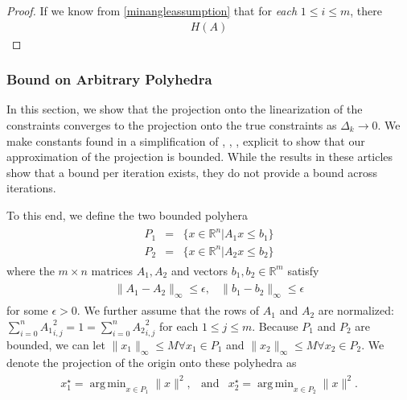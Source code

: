\documentclass{article}
\theoremstyle{case}
\numberwithin{theorem}{subsection}
\DeclareMathOperator*{\argmin}{arg\,min}
\newcommand{\dk}{\Delta_k}
\newcommand{\Rm}{\mathbb R^m}
\newcommand{\Rn}{\mathbb R^n}
\begin{document}
\begin{proof}
If we know from \cref{minangleassumption} that for \emph{each} $1 \le i \le m$, there 
\begin{align*}
H(A)
\end{align*}
\end{proof}

\subsubsection{Bound on Arbitrary Polyhedra}

In this section, we show that the projection onto the linearization of the constraints converges to the projection onto the true constraints as $\dk \to 0$.
We make constants found in a simplification of 
\cite{pena2020new},
\cite{hoffman_theorem},
\cite{continuity_of_metric_projections},
\cite{perturbations_of_linear_inequalities} 
explicit to show that our approximation of the projection is bounded.
While the results in these articles show that a bound per iteration exists, they do not provide a bound across iterations.

To this end, we define the two bounded polyhera
\begin{align*}
\begin{array}{ccc}
P_1 &=& \{ x \in \Rn | A_1x\le b_1 \} \\
P_2 &=& \{ x \in \Rn | A_2x\le b_2 \}
\end{array}
\end{align*}
where the $m\times n$ matrices $A_1, A_2$ and vectors $b_1, b_2 \in \Rm$ satisfy
\begin{align*}
\begin{array}{cc}
\|A_1 - A_2\|_{\infty} \le \epsilon, & \|b_1 - b_2\|_{\infty} \le \epsilon
\end{array}
\end{align*}
for some $\epsilon > 0$.
We further assume that the rows of $A_1$ and $A_2$ are normalized: $\sum_{i = 0}^n{A_1}_{i,j}^2 = 1 = \sum_{i = 0}^n{A_2}_{i,j}^2$ for each $1 \le j \le m$.
Because $P_1$ and $P_2$ are bounded, we can let $\|x_1\|_{\infty} \le M \forall x_1 \in P_1$ and $\|x_2\|_{\infty} \le M \forall x_2 \in P_2$.
We denote the projection of the origin onto these polyhedra as
\begin{align*}
\begin{array}{ccc}
x_1^{\star} = \argmin_{x\in P_1}\|x\|^2, &\textrm{and} & x_2^{\star} = \argmin_{x\in P_2}\|x\|^2.
\end{array}
\end{align*}
\end{document}
